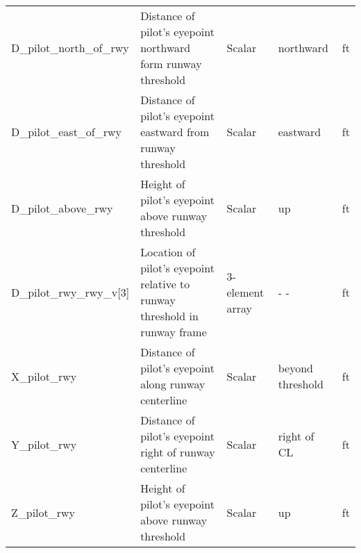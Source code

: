 \documentclass[10pt]{article}
\begin{document}
\begin{tabular}{|l|p{2.0in}|p{1.0in}|p{1.0in}|l|}
D\_pilot\_north\_of\_rwy & Distance of pilot's eyepoint northward form runway threshold & Scalar & northward & ft \\
D\_pilot\_east\_of\_rwy & Distance of pilot's eyepoint eastward from runway threshold & Scalar & eastward & ft \\
D\_pilot\_above\_rwy & Height of pilot's eyepoint above runway threshold & Scalar & up & ft \\
\hline
D\_pilot\_rwy\_rwy\_v[3] & Location of pilot's eyepoint relative to runway threshold in runway frame & 3-element array &          - - & ft \\
X\_pilot\_rwy & Distance of pilot's eyepoint along runway centerline & Scalar & beyond threshold & ft \\
Y\_pilot\_rwy & Distance of pilot's eyepoint right of runway centerline & Scalar & right of CL & ft \\
Z\_pilot\_rwy & Height of pilot's eyepoint above runway threshold & Scalar & up & ft \\
\hline
\end{tabular}
\end{document}
